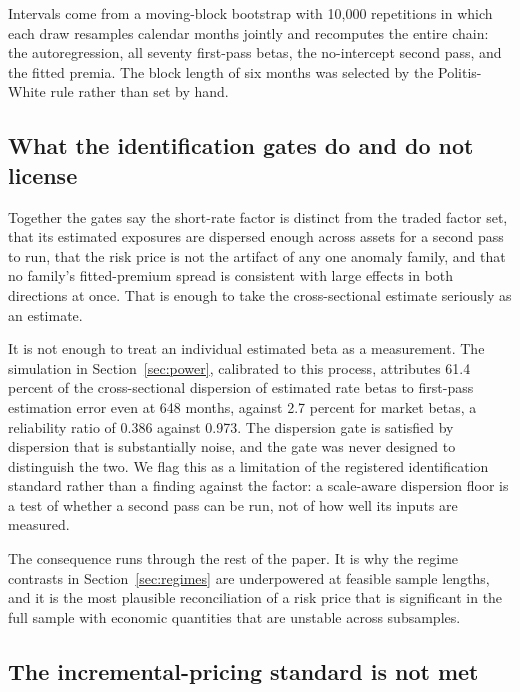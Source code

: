 \documentclass[11pt]{article}
\begin{document}
Intervals come from a moving-block bootstrap with 10,000 repetitions in which %
each draw resamples calendar months jointly and recomputes the entire chain: the
autoregression, all seventy first-pass betas, the no-intercept second pass, and
the fitted premia. The block length of six months was selected by the
Politis-White rule rather than set by hand. %

\subsection{What the identification gates do and do not license}

Together the gates say the short-rate factor is distinct from the traded factor
set, that its estimated exposures are dispersed enough across assets for a
second pass to run, that the risk price is not the artifact of any one anomaly
family, and that no family's fitted-premium spread is consistent with large
effects in both directions at once. That is enough to take the cross-sectional
estimate seriously as an estimate.

It is not enough to treat an individual estimated beta as a measurement. The
simulation in Section~\ref{sec:power}, calibrated to this process, attributes
61.4 percent of the cross-sectional dispersion of estimated rate betas to %
first-pass estimation error even at 648 months, against 2.7 percent for market %
betas, a reliability ratio of 0.386 against 0.973. %
The dispersion gate is satisfied by dispersion that is substantially noise, and
the gate was never designed to distinguish the two. We flag this as a limitation
of the registered identification standard rather than a finding against the
factor: a scale-aware dispersion floor is a test of whether a second pass can be
run, not of how well its inputs are measured.

The consequence runs through the rest of the paper. It is why the regime
contrasts in Section~\ref{sec:regimes} are underpowered at feasible sample
lengths, and it is the most plausible reconciliation of a risk price that is
significant in the full sample with economic quantities that are unstable across
subsamples.

\subsection{The incremental-pricing standard is not met}
\end{document}
